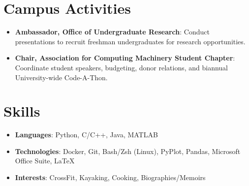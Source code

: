 \documentclass[letterpaper,11pt]{article}
\newcommand{\resumeItem}[2]{
  \item\small{
    \textbf{#1}{: #2 \vspace{-2pt}}
  }
}
\newcommand{\resumeSubItem}[2]{\resumeItem{#1}{#2}\vspace{-4pt}}
\newcommand{\resumeSubHeadingListStart}{\begin{itemize}[leftmargin=*]}
\newcommand{\resumeSubHeadingListEnd}{\end{itemize}}
\begin{document}
%
%
\section{Campus Activities}
  \resumeSubHeadingListStart
    \resumeSubItem{Ambassador, Office of Undergraduate Research}
      {Conduct presentations to recruit freshman undergraduates for research opportunities.}
    \resumeSubItem{Chair, Association for Computing Machinery Student Chapter}
      {Coordinate student speakers, budgeting, donor relations, and biannual University-wide Code-A-Thon.}
  \resumeSubHeadingListEnd

%
\section{Skills}
  \resumeSubHeadingListStart
    \resumeSubItem{Languages}{Python, C/C++, Java, MATLAB}
    \resumeSubItem{Technologies}{Docker, Git, Bash/Zsh (Linux), PyPlot, Pandas, Microsoft Office Suite, \LaTeX}
    \resumeSubItem{Interests}{CrossFit, Kayaking, Cooking, Biographies/Memoirs}
  \resumeSubHeadingListEnd


\end{document}
